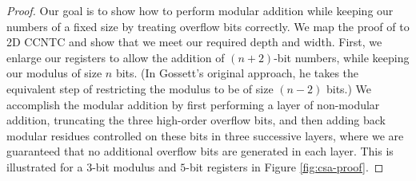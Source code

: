 \begin{proof}
Our goal is to show how to perform modular addition while keeping our numbers
of a fixed size by treating overflow bits correctly.
We map the proof of \cite{Gossett1998} to \textsc{2D CCNTC} and show that
we meet our required depth and width.
First, we enlarge our registers to allow the addition of $(n+2)$-bit numbers,
while keeping our modulus of size $n$ bits.
(In Gossett's original approach, he takes the equivalent step of restricting
the modulus to be of size $(n-2)$ bits.) We accomplish the modular addition
by first performing a layer of non-modular addition, truncating the three high-order
overflow bits, and then adding back modular residues controlled on these
bits in three successive layers, where we are guaranteed that no additional
overflow bits are generated in each layer.
This is illustrated for a $3$-bit modulus and $5$-bit registers
in Figure \ref{fig:csa-proof}.


\end{proof}
